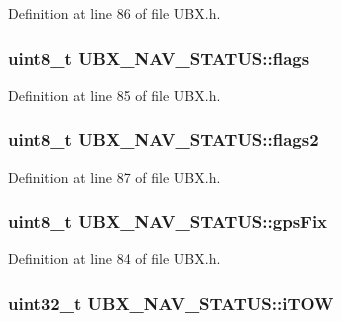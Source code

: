 \-Definition at line 86 of file \-U\-B\-X.\-h.

\hypertarget{struct_u_b_x___n_a_v___s_t_a_t_u_s_a06eed2ab154f7ab69c8a5f5acfbae99c}{
\subsubsection[{flags}]{\setlength{\rightskip}{0pt plus 5cm}uint8\-\_\-t {\bf \-U\-B\-X\-\_\-\-N\-A\-V\-\_\-\-S\-T\-A\-T\-U\-S\-::flags}}}\label{struct_u_b_x___n_a_v___s_t_a_t_u_s_a06eed2ab154f7ab69c8a5f5acfbae99c}


\-Definition at line 85 of file \-U\-B\-X.\-h.

\hypertarget{struct_u_b_x___n_a_v___s_t_a_t_u_s_a3e1ce741856096d697c3aafd6e66ac61}{
\subsubsection[{flags2}]{\setlength{\rightskip}{0pt plus 5cm}uint8\-\_\-t {\bf \-U\-B\-X\-\_\-\-N\-A\-V\-\_\-\-S\-T\-A\-T\-U\-S\-::flags2}}}\label{struct_u_b_x___n_a_v___s_t_a_t_u_s_a3e1ce741856096d697c3aafd6e66ac61}


\-Definition at line 87 of file \-U\-B\-X.\-h.

\hypertarget{struct_u_b_x___n_a_v___s_t_a_t_u_s_a9ada0b00d91062449f398439afec8e70}{
\subsubsection[{gps\-Fix}]{\setlength{\rightskip}{0pt plus 5cm}uint8\-\_\-t {\bf \-U\-B\-X\-\_\-\-N\-A\-V\-\_\-\-S\-T\-A\-T\-U\-S\-::gps\-Fix}}}\label{struct_u_b_x___n_a_v___s_t_a_t_u_s_a9ada0b00d91062449f398439afec8e70}


\-Definition at line 84 of file \-U\-B\-X.\-h.

\hypertarget{struct_u_b_x___n_a_v___s_t_a_t_u_s_a8413a77f5cf599f1d89fce98a304c5c1}{
\subsubsection[{i\-T\-O\-W}]{\setlength{\rightskip}{0pt plus 5cm}uint32\-\_\-t {\bf \-U\-B\-X\-\_\-\-N\-A\-V\-\_\-\-S\-T\-A\-T\-U\-S\-::i\-T\-O\-W}}}\label{struct_u_b_x___n_a_v___s_t_a_t_u_s_a8413a77f5cf599f1d89fce98a304c5c1}


